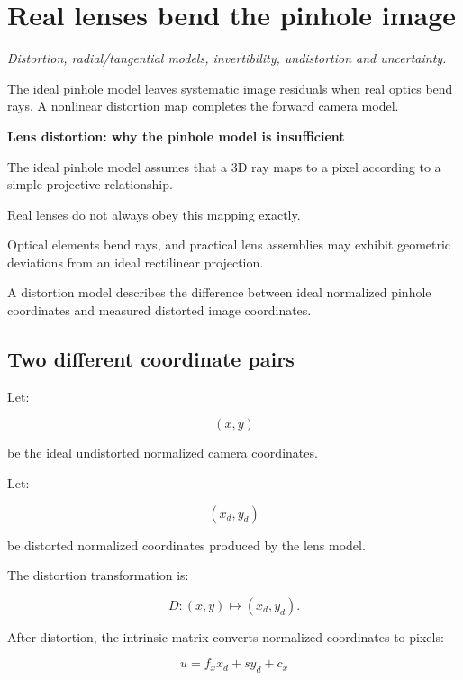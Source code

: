 \section{Real lenses bend the pinhole image}\label{02-foundations-ii-ch035-real-lenses-bend-the-pinhole-image}

\hypertarget{02-foundations-ii-ch035-real-lenses-bend-the-pinhole-image}{}

\emph{Distortion, radial/tangential models, invertibility, undistortion and uncertainty.}

The ideal pinhole model leaves systematic image residuals when real optics bend rays. A nonlinear distortion map completes the forward camera model.

\textbf{Lens distortion: why the pinhole model is insufficient}

The ideal pinhole model assumes that a 3D ray maps to a pixel according to a simple projective relationship.

Real lenses do not always obey this mapping exactly.

Optical elements bend rays, and practical lens assemblies may exhibit geometric deviations from an ideal rectilinear projection.

A distortion model describes the difference between ideal normalized pinhole coordinates and measured distorted image coordinates.

\subsection{Two different coordinate pairs}\label{02-foundations-ii-ch035-two-different-coordinate-pairs}

\hypertarget{02-foundations-ii-ch035-two-different-coordinate-pairs}{}

Let:

\[
 (x,y)
\]

be the ideal undistorted normalized camera coordinates.

Let:

\[
 (x_d,y_d)
\]

be distorted normalized coordinates produced by the lens model.

The distortion transformation is:

\[
 \boxed{ D: (x,y)\mapsto(x_d,y_d) }.
\]

After distortion, the intrinsic matrix converts normalized coordinates to pixels:

\[
 \boxed{ u=f_xx_d+sy_d+c_x }
\]

